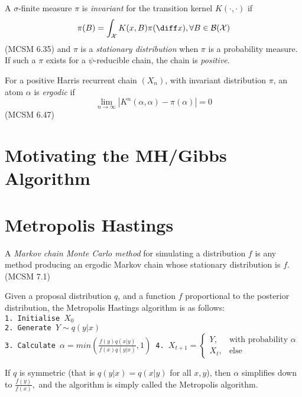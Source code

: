\begin{definition}
    A $\sigma$-finite measure $\pi$ is \emph{invariant} for the transition kernel $K(\cdot,\cdot)$ if $$\pi(B) = \int_\mathcal{X} K(x, B)\pi(\diff x), \forall B\in\mathcal{B}(\mathcal{X})$$ (MCSM 6.35) and $\pi$ is a \emph{stationary distribution} when $\pi$ is a probability measure. If such a $\pi$ exists for a $\psi$-reducible chain, the chain is \emph{positive}.
\end{definition}

\begin{definition}[Ergodic]
    For a positive Harris recurrent chain $(X_n)$, with invariant distribution $\pi$, an atom $\alpha$ is \emph{ergodic} if
    $$\lim_{n\to\infty}|K^n(\alpha, \alpha) - \pi(\alpha)| = 0$$ (MCSM 6.47)
\end{definition}

\color{black}

\section{Motivating the MH/Gibbs Algorithm}

\section{Metropolis Hastings}

\begin{definition}
    A \emph{Markov chain Monte Carlo method} for simulating a distribution $f$ is any method producing an ergodic Markov chain whose stationary distribution is $f$. (MCSM 7.1)
\end{definition}

Given a proposal distribution $q$, and a function $f$ proportional to the posterior distribution, the Metropolis Hastings algorithm is as follows: \texttt{\\
1. Initialise $X_0$\\
2. Generate $Y \sim q(y|x)$\\
3. Calculate $\alpha =
min\left(\frac{f(y)q(x|y)}{f(x)q(y|x)}, 1\right)$
4. $X_{t+1} = \begin{cases} Y, & \text{with probability } \alpha\\ X_{t},& \text{else}\end{cases}$
}

If $q$ is symmetric (that is $q(y|x) = q(x|y)$ for all $x, y$), then $\alpha$ simplifies down to $\frac{f(y)}{f(x)},$ and the algorithm is simply called the Metropolis algorithm.

